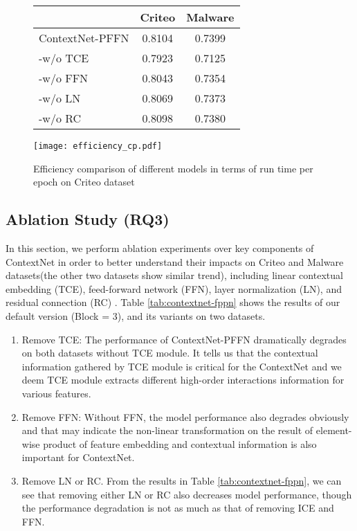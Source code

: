 \documentclass[sigconf]{acmart}
\begin{document}
\begin{figure}
  \begin{minipage}[b]{.45\linewidth}
    \centering
    \begin{tabular}{l|cc}
    \toprule
      & \textbf{Criteo} & \textbf{Malware}   \\
    \midrule
    ContextNet-PFFN & 0.8104 & 0.7399 \\
    -w/o TCE &  0.7923 &  0.7125 \\
      -w/o FFN & 0.8043 & 0.7354 \\
      -w/o LN & 0.8069 & 0.7373 \\
      -w/o RC & 0.8098 & 0.7380 \\
    \bottomrule
    \end{tabular}
    \label{tab:contextnet-fppn}
    \end{minipage}
    \begin{minipage}[b]{.45\linewidth}
      \centering
      \texttt{[image: efficiency\_cp.pdf]}
      \caption{Efficiency comparison of different models in terms of run time per epoch on Criteo dataset}
      \label{fig:efficiency_cp}
    \end{minipage}\end{figure}


\subsection{Ablation Study (RQ3)}
In this section, we perform ablation experiments over key components of ContextNet in order to better understand their impacts on Criteo and Malware datasets(the other two datasets show similar trend), including linear contextual embedding (TCE), feed-forward network (FFN), layer normalization (LN), and residual connection (RC) . Table \ref{tab:contextnet-fppn} shows the results of our default version (Block = $3$), and its variants on two datasets.




\begin{enumerate}
  \item Remove TCE: The performance of ContextNet-PFFN dramatically degrades on both datasets without TCE module. It tells us that the contextual information gathered by TCE module is critical for the ContextNet and we deem TCE module extracts different high-order interactions information for various features.

  \item Remove FFN: Without FFN, the model performance also degrades obviously and that may indicate the non-linear transformation on the result of element-wise product of feature embedding and contextual information is also important for ContextNet.

  \item Remove LN or RC. From the results in Table \ref{tab:contextnet-fppn}, we can see that removing either LN or RC also decreases model performance, though the performance degradation is not as much as that of  removing ICE and FFN.
\end{enumerate}
\end{document}
